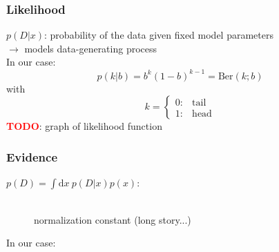 \documentclass[t, aspectratio=169]{beamer}
\newcommand{\todo}{\textcolor{red}{\textbf{TODO}}}
\renewcommand{\d}{\mathrm{d}}
\begin{document}
\begin{frame}
  \frametitle{Likelihood}
  $p(D|x)$: probability of the data given fixed model parameters\\
  $\rightarrow$ models data-generating process\\
  \bigbreak
  In our case:
  \begin{equation*}
    p(k|b) = b^k(1-b)^{k-1} = \mathrm{Ber}(k;b)
  \end{equation*}
  with
  \begin{equation*}
    k = \begin{cases} 0:& \mathrm{tail}\\
      1:& \mathrm{head}
    \end{cases}
  \end{equation*}
  \todo: graph of likelihood function
\end{frame}


\begin{frame}
  \frametitle{Evidence}
  \begin{description}
  \item[$p(D) = \int \d x\ p(D|x)p(x)$:]\hfill \\
    normalization constant (long story...)
  \end{description}
  In our case:
\end{frame}
\end{document}
